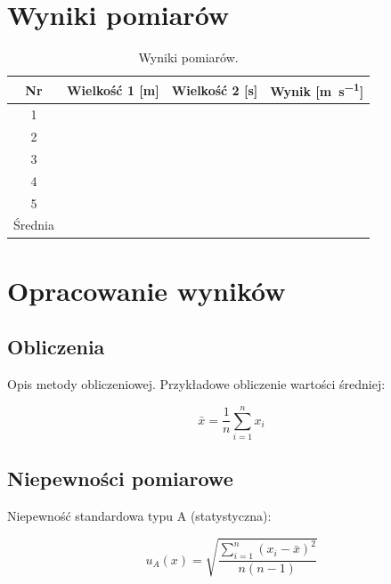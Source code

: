 \documentclass[12pt, a4paper]{article}
\begin{document}
\section{Wyniki pomiarów}

\begin{table}[H]
    \centering
    \caption{Wyniki pomiarów.}
    \label{tab:pomiary}
    \begin{tabular}{c S[table-format=2.2] S[table-format=1.4] S[table-format=1.4]}
        \toprule
        \textbf{Nr} & \textbf{Wielkość 1 [\si{\meter}]} & \textbf{Wielkość 2 [\si{\second}]} & \textbf{Wynik [\si{\meter\per\second}]} \\
          &  &  &  \\
        2  &  &  &  \\
        3  &  &  &  \\
        4  &  &  &  \\
        5  &  &  &  \\
        \midrule
        Średnia & & & \\
        \bottomrule
    \end{tabular}
\end{table}

\section{Opracowanie wyników}

\subsection{Obliczenia}

Opis metody obliczeniowej. Przykładowe obliczenie wartości średniej:

\begin{equation}
    \bar{x} = \frac{1}{n} \sum_{i=1}^{n} x_i
\end{equation}

\subsection{Niepewności pomiarowe}

Niepewność standardowa typu A (statystyczna):

\begin{equation}
    u_A(x) = \sqrt{\frac{\sum_{i=1}^{n}(x_i - \bar{x})^2}{n(n-1)}}
\end{equation}
\end{document}
